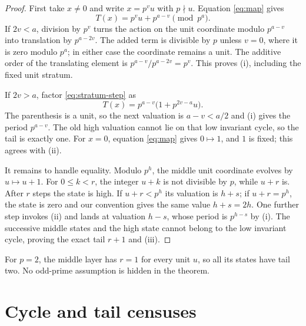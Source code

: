 \documentclass[a4paper,10pt]{amsart}
\theoremstyle{remark}
\begin{document}
\begin{proof}
First take $x\ne0$ and write $x=p^vu$ with $p\nmid u$.  Equation
\eqref{eq:map} gives
\begin{equation}\label{eq:stratum-step}
 T(x)=p^vu+p^{a-v}\pmod {p^a}.
\end{equation}
If $2v<a$, division by $p^v$ turns the action on the unit coordinate modulo
$p^{a-v}$ into translation by $p^{a-2v}$.  The added term is divisible by
$p$ unless $v=0$, where it is zero modulo $p^a$; in either case the coordinate
remains a unit.  The additive order of the translating element is
$p^{a-v}/p^{a-2v}=p^v$.  This proves (i), including the fixed unit stratum.

If $2v>a$, factor \eqref{eq:stratum-step} as
\begin{equation}\label{eq:high-fall}
 T(x)=p^{a-v}\bigl(1+p^{2v-a}u\bigr).
\end{equation}
The parenthesis is a unit, so the next valuation is $a-v<a/2$ and (i) gives
the period $p^{a-v}$.  The old high valuation cannot lie on that low invariant
cycle, so the tail is exactly one.  For $x=0$, equation \eqref{eq:map} gives
$0\mapsto1$, and $1$ is fixed; this agrees with (ii).

It remains to handle equality.  Modulo $p^h$, the middle unit coordinate
evolves by $u\mapsto u+1$.  For $0\leq k<r$, the integer $u+k$ is not divisible
by $p$, while $u+r$ is.  After $r$ steps the state is high.  If $u+r<p^h$ its
valuation is $h+s$; if $u+r=p^h$, the state is zero and our convention gives
the same value $h+s=2h$.  One further step invokes (ii) and lands at valuation
$h-s$, whose period is $p^{h-s}$ by (i).  The successive middle states and the
high state cannot belong to the low invariant cycle, proving the exact tail
$r+1$ and (iii).
\end{proof}

For $p=2$, the middle layer has $r=1$ for every unit $u$, so all its states
have tail two.  No odd-prime assumption is hidden in the theorem.

\section{Cycle and tail censuses}
\end{document}
